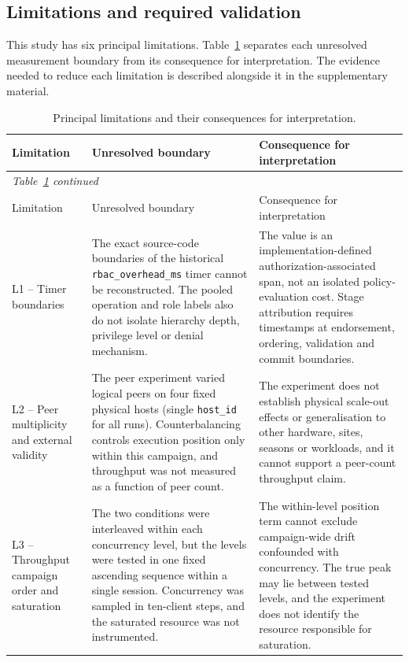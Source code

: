 \subsection{Limitations and required validation}
\label{sec:limitations}

This study has six principal limitations. Table~\ref{tab:limitations} separates each unresolved measurement boundary from its consequence for interpretation. The evidence needed to reduce each limitation is described alongside it in the supplementary material.

\begin{center}
\small
\begin{longtable}{p{2.0cm}p{5.0cm}p{5.6cm}}
\caption{Principal limitations and their consequences for interpretation.}
\label{tab:limitations}\\
\toprule
Limitation & Unresolved boundary & Consequence for interpretation \\
\midrule
\endfirsthead
\multicolumn{3}{l}{\small\itshape Table~\ref{tab:limitations} continued} \\
\toprule
Limitation & Unresolved boundary & Consequence for interpretation \\
\midrule
\endhead
\bottomrule
\endfoot
L1 -- Timer boundaries & The exact source-code boundaries of the historical \texttt{rbac\_overhead\_ms} timer cannot be reconstructed. The pooled operation and role labels also do not isolate hierarchy depth, privilege level or denial mechanism. & The value is an implementation-defined authorization-associated span, not an isolated policy-evaluation cost. Stage attribution requires timestamps at endorsement, ordering, validation and commit boundaries. \\
L2 -- Peer multiplicity and external validity & The peer experiment varied logical peers on four fixed physical hosts (single \texttt{host\_id} for all runs). Counterbalancing controls execution position only within this campaign, and throughput was not measured as a function of peer count. & The experiment does not establish physical scale-out effects or generalisation to other hardware, sites, seasons or workloads, and it cannot support a peer-count throughput claim. \\
L3 -- Throughput campaign order and saturation & The two conditions were interleaved within each concurrency level, but the levels were tested in one fixed ascending sequence within a single session. Concurrency was sampled in ten-client steps, and the saturated resource was not instrumented. & The within-level position term cannot exclude campaign-wide drift confounded with concurrency. The true peak may lie between tested levels, and the experiment does not identify the resource responsible for saturation. \\

\end{longtable}
\end{center}
